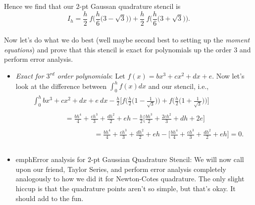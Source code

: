 \documentclass[paper=a4, fontsize=11pt]{scrartcl} %
\numberwithin{equation}{section} %
\numberwithin{figure}{section} %
\numberwithin{table}{section} %
\begin{document}
Hence we find that our $2$-pt Gaussan quadrature stencil is\\

$$I_h = \frac{h}{2}\ f\Bigg( \frac{h}{6}\big(3-\sqrt{3}\big) \Bigg) + \frac{h}{2}\ f\Bigg( \frac{h}{6}\big(3+\sqrt{3}\big) \Bigg).$$ \\

Now let's do what we do best (well maybe second best to setting up the \emph{moment equations}) and prove that this stencil is exact for polynomials up the order $3$ and perform error analysis. \\

\begin{itemize}

\item \emph{Exact for $3^{rd}$ order polynomials}:  Let $f(x) = bx^3 + cx^2+dx+e$. Now let's look at the difference between $\int_0^h f(x) dx$ and our stencil, i.e.,\\

\begin{align}
\nonumber
\begin{split}
&\ \int_0^h  bx^3 + cx^2+dx+e\ dx -  \frac{h}{2}\Bigg[ f\Bigg( \frac{h}{2}\Big(1-\frac{1}{\sqrt{3}}\Big) \Bigg) + f\Bigg( \frac{h}{2}\Big(1+\frac{1}{\sqrt{3}} \Big) \Bigg)\Bigg] \\ \\
& \ \ \ \ \  \ \ \ \ \ \ \ \ \ \ \  \ \ \ \ \ \  = \frac{bh^4}{4}+\frac{ch^3}{3}+\frac{dh^2}{2}+eh - \frac{h}{2} \Bigg[  \frac{bh^3}{2} + \frac{2ch^2}{3}+dh+2e \Bigg] \\ \\
& \ \ \ \ \  \ \ \ \ \ \ \ \ \ \ \  \ \ \ \ \ \ \ \ \ \ \ \ \ \ \ \  \ \ \ \ \ \ \ \ \ = \frac{bh^4}{4}+\frac{ch^3}{3}+\frac{dh^2}{2}+eh  - \Bigg[   \frac{bh^4}{4} + \frac{ch^3}{3}+\frac{dh^2}{2}+eh \Bigg]= 0.\\ \\
\end{split}
\end{align}

\item emph{Error analysis for $2$-pt Gaussian Quadrature Stencil}: We will now call upon our friend, Taylor Series, and perform error analysis completely analogously to how we did it for Newton-Cotes quadrature. The only slight hiccup is that the quadrature points aren't so simple, but that's okay. It should add to the fun.\\


\end{itemize}
\end{document}
